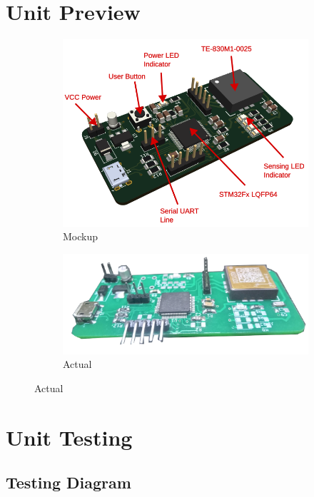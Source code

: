 \documentclass[a4paper,12pt,oneside,pdflatex,italian,final,twocolumn]{article}
\begin{document}
	\section{Unit Preview}
	\begin{figure}[h]
		\centering
		\begin{subfigure}{0.45\textwidth}
			\includegraphics[width=\textwidth]{images/vibparts.png}
			\caption{Mockup}
		\end{subfigure}
		\begin{subfigure}{0.45\textwidth}
			\includegraphics[width=\textwidth]{images/vibs.png}
			\caption{Actual}
		\end{subfigure}
	\end{figure}

	\section{Unit Testing}

	\subsection{Testing Diagram}
\end{document}
